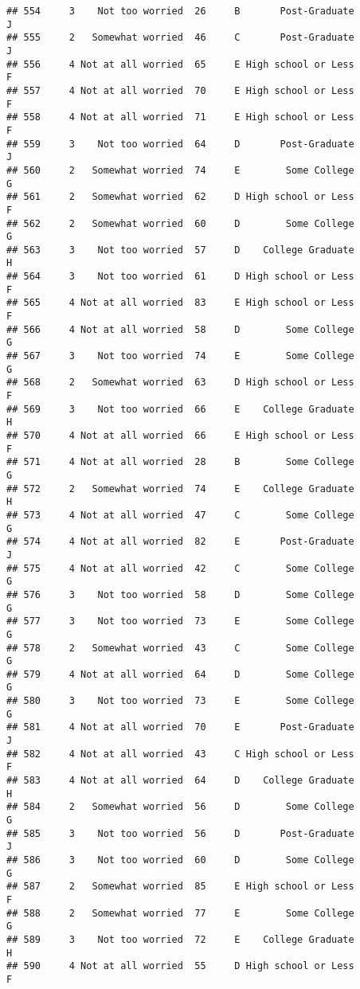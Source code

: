 \documentclass[
]{article}
\begin{document}
\begin{verbatim}
## 554     3    Not too worried  26     B       Post-Graduate         J
## 555     2   Somewhat worried  46     C       Post-Graduate         J
## 556     4 Not at all worried  65     E High school or Less         F
## 557     4 Not at all worried  70     E High school or Less         F
## 558     4 Not at all worried  71     E High school or Less         F
## 559     3    Not too worried  64     D       Post-Graduate         J
## 560     2   Somewhat worried  74     E        Some College         G
## 561     2   Somewhat worried  62     D High school or Less         F
## 562     2   Somewhat worried  60     D        Some College         G
## 563     3    Not too worried  57     D    College Graduate         H
## 564     3    Not too worried  61     D High school or Less         F
## 565     4 Not at all worried  83     E High school or Less         F
## 566     4 Not at all worried  58     D        Some College         G
## 567     3    Not too worried  74     E        Some College         G
## 568     2   Somewhat worried  63     D High school or Less         F
## 569     3    Not too worried  66     E    College Graduate         H
## 570     4 Not at all worried  66     E High school or Less         F
## 571     4 Not at all worried  28     B        Some College         G
## 572     2   Somewhat worried  74     E    College Graduate         H
## 573     4 Not at all worried  47     C        Some College         G
## 574     4 Not at all worried  82     E       Post-Graduate         J
## 575     4 Not at all worried  42     C        Some College         G
## 576     3    Not too worried  58     D        Some College         G
## 577     3    Not too worried  73     E        Some College         G
## 578     2   Somewhat worried  43     C        Some College         G
## 579     4 Not at all worried  64     D        Some College         G
## 580     3    Not too worried  73     E        Some College         G
## 581     4 Not at all worried  70     E       Post-Graduate         J
## 582     4 Not at all worried  43     C High school or Less         F
## 583     4 Not at all worried  64     D    College Graduate         H
## 584     2   Somewhat worried  56     D        Some College         G
## 585     3    Not too worried  56     D       Post-Graduate         J
## 586     3    Not too worried  60     D        Some College         G
## 587     2   Somewhat worried  85     E High school or Less         F
## 588     2   Somewhat worried  77     E        Some College         G
## 589     3    Not too worried  72     E    College Graduate         H
## 590     4 Not at all worried  55     D High school or Less         F

\end{verbatim}
\end{document}
